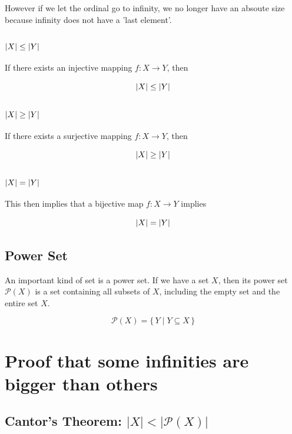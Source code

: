 \documentclass[11pt,a4paper]{article}
\begin{document}
However if we let the ordinal go to infinity, we no longer have an absoute size because infinity does not
have a 'last element'.

\subsubsection{$\abs{X} \leq \abs{Y}$}

If there exists an injective mapping $f: X \to Y$, then

\begin{equation}
   \abs{X} \leq \abs{Y}
\end{equation}

\subsubsection{$\abs{X} \geq \abs{Y}$}

If there exists a surjective mapping $f: X \to Y$, then

\begin{equation}
   \abs{X} \geq \abs{Y}
\end{equation}

\subsubsection{$\abs{X} = \abs{Y}$}

This then implies that a bijective map $f: X \to Y$ implies

\begin{equation}
   \abs{X} = \abs{Y}
\end{equation}

\subsection{Power Set}

An important kind of set is a power set. If we have a set $X$, then its power
set $\mathcal{P}(X)$ is a set containing all subsets of $X$, including the empty set and the
entire set $X$.

\[
  \mathcal{P}(X) = \{\, Y \mid Y \subseteq X \, \}
\]

\section{Proof that some infinities are bigger than others}


\subsection{Cantor's Theorem: $\lvert X\rvert < \lvert\mathcal{P}(X)\rvert$}
\end{document}
